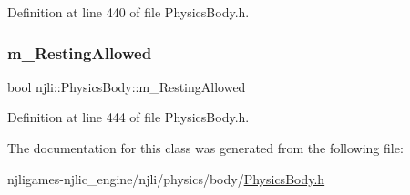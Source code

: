 Definition at line 440 of file Physics\+Body.\+h.

\mbox{\label{classnjli_1_1_physics_body_ae0f4e419f8e05558232170246fe7ad83}} 
\subsubsection{\texorpdfstring{m\+\_\+\+Resting\+Allowed}{m\_RestingAllowed}}
{\footnotesize\ttfamily bool njli\+::\+Physics\+Body\+::m\+\_\+\+Resting\+Allowed\hspace{0.3cm}{\ttfamily [private]}}



Definition at line 444 of file Physics\+Body.\+h.



The documentation for this class was generated from the following file\+:\begin{DoxyCompactItemize}
\item 
njligames-\/njlic\+\_\+engine/njli/physics/body/\mbox{\hyperlink{_physics_body_8h}{Physics\+Body.\+h}}\end{DoxyCompactItemize}
